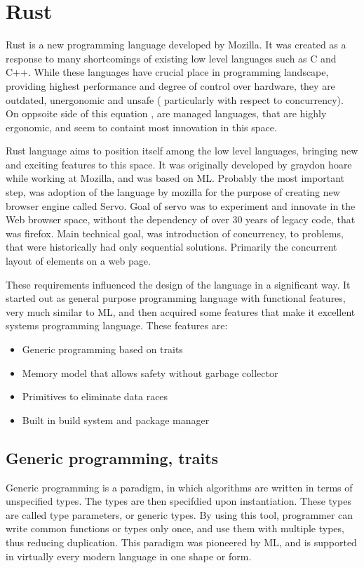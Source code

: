 \section{Rust}
Rust is a new programming language developed by Mozilla. It was created as a response to many shortcomings of existing low level
languages such as C and C++. While these languages have crucial place in programming landscape, providing highest performance and
degree of control over hardware, they are outdated, unergonomic and unsafe ( particularly with respect to concurrency). On oppsoite
side of this equation , are managed languages, that are highly ergonomic, and seem to containt most innovation in this space.

Rust language aims to position itself among the low level languages, bringing new and exciting features to this space.
It was originally developed by graydon hoare   while working at Mozilla, and was based on
ML. Probably the most important step, was adoption of the language by mozilla for the purpose of creating new browser engine
called Servo. Goal of servo was to experiment and innovate in the Web browser space, without
the dependency of over 30 years of legacy code, that was firefox. Main technical goal, was introduction of concurrency,
to problems, that were historically had only sequential solutions. Primarily the concurrent layout of elements on a web page.


These requirements influenced the design of the language in a significant way. It started out as general purpose programming
language with functional features, very much similar to ML, and then acquired some features that make it excellent
systems programming language. These features are:
\begin{itemize}
    \item Generic programming based on traits
    \item Memory model that allows safety without garbage collector
    \item Primitives to eliminate data races
    \item Built in build system and package manager
\end{itemize}

\subsection{Generic programming, traits}
Generic programming is a paradigm, in which algorithms are written in terms of unspecified types.
The types are then specifdied upon instantiation. These types are called type parameters, or generic types.
By using this tool, programmer can write common functions or types only once, and use them with multiple
types, thus reducing duplication. This paradigm was pioneered by ML, and is supported in virtually every
modern language in one shape or form.

